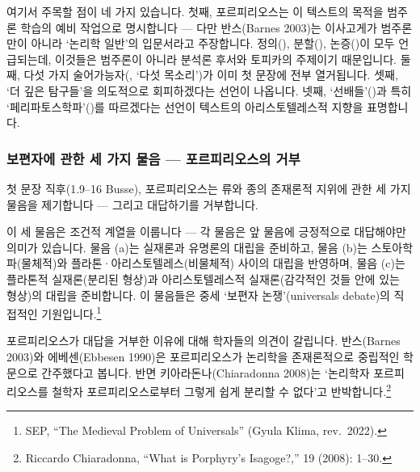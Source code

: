\documentclass[12pt, a4paper]{article}
\begin{document}
여기서 주목할 점이 네 가지 있습니다. 첫째, 포르피리오스는 이 텍스트의 목적을 범주론 학습의 예비 작업으로 명시합니다 --- 다만 반스(Barnes 2003)는 이사고게가 범주론만이 아니라 `논리학 일반'의 입문서라고 주장합니다. 정의(), 분할(), 논증()이 모두 언급되는데, 이것들은 범주론이 아니라 분석론 후서와 토피카의 주제이기 때문입니다. 둘째, 다섯 가지 술어가능자(, `다섯 목소리')가 이미 첫 문장에 전부 열거됩니다. 셋째, `더 깊은 탐구들'을 의도적으로 회피하겠다는 선언이 나옵니다. 넷째, `선배들'()과 특히 `페리파토스학파'()를 따르겠다는 선언이 텍스트의 아리스토텔레스적 지향을 표명합니다.

\subsubsection{보편자에 관한 세 가지 물음 --- 포르피리오스의 거부}

첫 문장 직후(1.9--16 Busse), 포르피리오스는 류와 종의 존재론적 지위에 관한 세 가지 물음을 제기합니다 --- 그리고 대답하기를 거부합니다.


이 세 물음은 조건적 계열을 이룹니다 --- 각 물음은 앞 물음에 긍정적으로 대답해야만 의미가 있습니다. 물음 (a)는 실재론과 유명론의 대립을 준비하고, 물음 (b)는 스토아학파(물체적)와 플라톤·아리스토텔레스(비물체적) 사이의 대립을 반영하며, 물음 (c)는 플라톤적 실재론(분리된 형상)과 아리스토텔레스적 실재론(감각적인 것들 안에 있는 형상)의 대립을 준비합니다. 이 물음들은 중세 `보편자 논쟁'(universals debate)의 직접적인 기원입니다.\footnote{SEP, ``The Medieval Problem of Universals'' (Gyula Klima, rev.\ 2022).}

포르피리오스가 대답을 거부한 이유에 대해 학자들의 의견이 갈립니다. 반스(Barnes 2003)와 에베센(Ebbesen 1990)은 포르피리오스가 논리학을 존재론적으로 중립적인 학문으로 간주했다고 봅니다. 반면 키아라돈나(Chiaradonna 2008)는 `논리학자 포르피리오스를 철학자 포르피리오스로부터 그렇게 쉽게 분리할 수 없다'고 반박합니다.\footnote{Riccardo Chiaradonna, ``What is Porphyry's Isagoge?,''  19 (2008): 1--30.}
\end{document}
